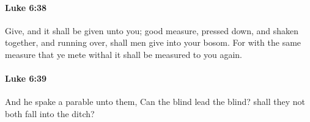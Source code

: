 		\paragraph{Luke 6:38} %
			\label{LUKE-6-38}

			Give, and it shall be given unto you; good measure, pressed down, and shaken together, and running over, shall men give into your bosom. For with the same measure that ye mete withal it shall be measured to you again.

			\begin{framed}
			\scriptsize
				\begin{compactdesc}
					\item[SBLG] 
				\end{compactdesc}
			\end{framed}

		\paragraph{Luke 6:39} %
			\label{LUKE-6-39}

			And he spake a parable unto them, Can the blind lead the blind? shall they not both fall into the ditch?

